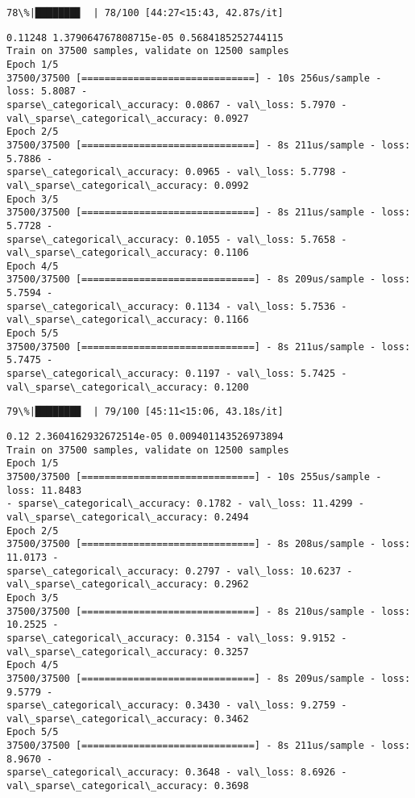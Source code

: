 \documentclass[11pt]{article}
\begin{document}
    \begin{Verbatim}[commandchars=\\\{\}]
 78\%|███████▊  | 78/100 [44:27<15:43, 42.87s/it]
    \end{Verbatim}

    \begin{Verbatim}[commandchars=\\\{\}]
0.11248 1.379064767808715e-05 0.5684185252744115
Train on 37500 samples, validate on 12500 samples
Epoch 1/5
37500/37500 [==============================] - 10s 256us/sample - loss: 5.8087 -
sparse\_categorical\_accuracy: 0.0867 - val\_loss: 5.7970 -
val\_sparse\_categorical\_accuracy: 0.0927
Epoch 2/5
37500/37500 [==============================] - 8s 211us/sample - loss: 5.7886 -
sparse\_categorical\_accuracy: 0.0965 - val\_loss: 5.7798 -
val\_sparse\_categorical\_accuracy: 0.0992
Epoch 3/5
37500/37500 [==============================] - 8s 211us/sample - loss: 5.7728 -
sparse\_categorical\_accuracy: 0.1055 - val\_loss: 5.7658 -
val\_sparse\_categorical\_accuracy: 0.1106
Epoch 4/5
37500/37500 [==============================] - 8s 209us/sample - loss: 5.7594 -
sparse\_categorical\_accuracy: 0.1134 - val\_loss: 5.7536 -
val\_sparse\_categorical\_accuracy: 0.1166
Epoch 5/5
37500/37500 [==============================] - 8s 211us/sample - loss: 5.7475 -
sparse\_categorical\_accuracy: 0.1197 - val\_loss: 5.7425 -
val\_sparse\_categorical\_accuracy: 0.1200
    \end{Verbatim}

    \begin{Verbatim}[commandchars=\\\{\}]
 79\%|███████▉  | 79/100 [45:11<15:06, 43.18s/it]
    \end{Verbatim}

    \begin{Verbatim}[commandchars=\\\{\}]
0.12 2.3604162932672514e-05 0.009401143526973894
Train on 37500 samples, validate on 12500 samples
Epoch 1/5
37500/37500 [==============================] - 10s 255us/sample - loss: 11.8483
- sparse\_categorical\_accuracy: 0.1782 - val\_loss: 11.4299 -
val\_sparse\_categorical\_accuracy: 0.2494
Epoch 2/5
37500/37500 [==============================] - 8s 208us/sample - loss: 11.0173 -
sparse\_categorical\_accuracy: 0.2797 - val\_loss: 10.6237 -
val\_sparse\_categorical\_accuracy: 0.2962
Epoch 3/5
37500/37500 [==============================] - 8s 210us/sample - loss: 10.2525 -
sparse\_categorical\_accuracy: 0.3154 - val\_loss: 9.9152 -
val\_sparse\_categorical\_accuracy: 0.3257
Epoch 4/5
37500/37500 [==============================] - 8s 209us/sample - loss: 9.5779 -
sparse\_categorical\_accuracy: 0.3430 - val\_loss: 9.2759 -
val\_sparse\_categorical\_accuracy: 0.3462
Epoch 5/5
37500/37500 [==============================] - 8s 211us/sample - loss: 8.9670 -
sparse\_categorical\_accuracy: 0.3648 - val\_loss: 8.6926 -
val\_sparse\_categorical\_accuracy: 0.3698
    \end{Verbatim}
\end{document}

